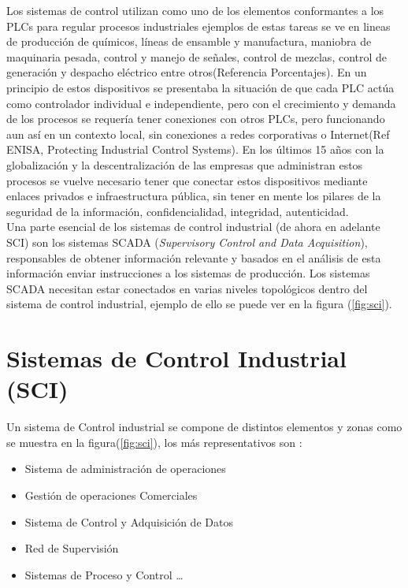 \documentclass[jou,apacite]{apa6}   %
\begin{document}
Los sistemas de control utilizan como uno de los elementos conformantes  a los PLCs  para regular procesos industriales  ejemplos de estas tareas se ve
en lineas de producción de químicos, líneas de ensamble y manufactura, maniobra de maquinaria pesada,  control y manejo de señales, control de mezclas, 
control de generación y despacho eléctrico entre otros(Referencia Porcentajes). En un principio de estos dispositivos se presentaba la situación de que 
cada PLC actúa como controlador individual e independiente, pero con el crecimiento y demanda de los procesos se requería tener conexiones con otros 
PLCs, pero funcionando aun así en un contexto local, sin conexiones a redes corporativas o Internet(Ref ENISA, Protecting Industrial Control Systems). 
En los últimos 15 años con la globalización y la descentralización de las empresas que administran estos procesos se vuelve necesario tener que 
conectar estos dispositivos mediante enlaces privados e infraestructura pública, sin tener en mente los pilares de la seguridad de la información, 
confidencialidad, integridad, autenticidad.\\


Una parte esencial de los sistemas de control industrial (de ahora en adelante SCI) son los sistemas SCADA (\textit{Supervisory Control and Data Acquisition}), responsables de obtener información relevante y basados en el análisis de esta información enviar instrucciones a los sistemas de producción. Los sistemas SCADA necesitan estar conectados en varias niveles topológicos dentro del sistema de control industrial,  ejemplo de ello se puede ver en la figura (\ref{fig:sci}). 
\section{Sistemas de Control Industrial (SCI)}
Un sistema de Control industrial se compone de distintos elementos y zonas como se muestra en la figura(\ref{fig:sci}),  los más representativos son :
\begin{itemize}
  \item Sistema de administración de  operaciones
  \item Gestión de operaciones Comerciales
  \item Sistema de Control y Adquisición de Datos
  \item Red de Supervisión
  \item Sistemas de Proceso y Control \ldots
\end{itemize}
\end{document}
